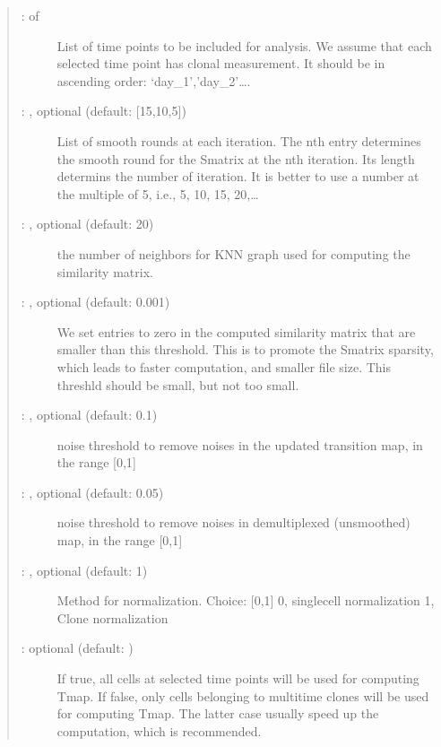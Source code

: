 \documentclass[letterpaper,10pt,english]{sphinxmanual}
\begin{document}
\begin{fulllineitems}
\begin{quote}
\begin{description}
\begin{description}
\item[{ :  of }] \leavevmode
List of time points to be included for analysis.
We assume that each selected time point has clonal measurement.
It should be in ascending order: ‘day\_1’,’day\_2’….

\item[{ : , optional (default: {[}15,10,5{]})}] \leavevmode
List of smooth rounds at each iteration.
The n\sphinxhyphen{}th entry determines the smooth round for the Smatrix
at the n\sphinxhyphen{}th iteration. Its length determins the number of
iteration. It is better to use a number at the multiple of
5, i.e., 5, 10, 15, 20,…

\item[{ : , optional (default: 20)}] \leavevmode
the number of neighbors for KNN graph used for computing the
similarity matrix.

\item[{ : , optional (default: 0.001)}] \leavevmode
We set entries to zero in the computed similarity matrix that
are smaller than this threshold. This is to promote the Smatrix
sparsity, which leads to faster computation, and smaller file size.
This threshld should be small, but not too small.

\item[{ : , optional (default: 0.1)}] \leavevmode
noise threshold to remove noises in the updated transition map,
in the range {[}0,1{]}

\item[{ : , optional (default: 0.05)}] \leavevmode
noise threshold to remove noises in demultiplexed (un\sphinxhyphen{}smoothed) map,
in the range {[}0,1{]}

\item[{ : , optional (default: 1)}] \leavevmode
Method for normalization. Choice: {[}0,1{]}
0, single\sphinxhyphen{}cell normalization
1, Clone normalization

\item[{ :  optional (default: )}] \leavevmode
If true, all cells at selected time points will be used for computing
Tmap. If false, only cells belonging to multi\sphinxhyphen{}time clones will be used
for computing Tmap. The latter case usually speed up the computation,
which is recommended.


\end{description}
\end{description}
\end{quote}
\end{fulllineitems}
\end{document}
